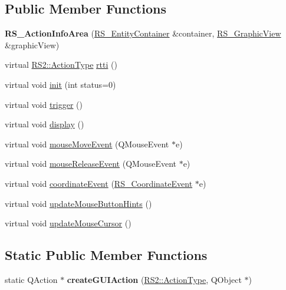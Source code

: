 \subsection*{Public Member Functions}
\begin{DoxyCompactItemize}
\item 
\hypertarget{classRS__ActionInfoArea_aeaefc6938d72919ed31129059a7d3b2c}{{\bfseries R\-S\-\_\-\-Action\-Info\-Area} (\hyperlink{classRS__EntityContainer}{R\-S\-\_\-\-Entity\-Container} \&container, \hyperlink{classRS__GraphicView}{R\-S\-\_\-\-Graphic\-View} \&graphic\-View)}\label{classRS__ActionInfoArea_aeaefc6938d72919ed31129059a7d3b2c}

\item 
virtual \hyperlink{classRS2_afe3523e0bc41fd637b892321cfc4b9d7}{R\-S2\-::\-Action\-Type} \hyperlink{classRS__ActionInfoArea_a74c3f74c070e1ca046324e88b93ea7b8}{rtti} ()
\item 
virtual void \hyperlink{classRS__ActionInfoArea_a4ad8dbce488f70efe38e14b924256168}{init} (int status=0)
\item 
virtual void \hyperlink{classRS__ActionInfoArea_aa4a77a0063610c4a69c99e517e89c92a}{trigger} ()
\item 
virtual void \hyperlink{classRS__ActionInfoArea_a412ba2be3917ab973e9a945afd234772}{display} ()
\item 
virtual void \hyperlink{classRS__ActionInfoArea_a1d9520f7011635bfa38f499212f42f84}{mouse\-Move\-Event} (Q\-Mouse\-Event $\ast$e)
\item 
virtual void \hyperlink{classRS__ActionInfoArea_a917b2bc96d7884fda3d06d3d33a9d952}{mouse\-Release\-Event} (Q\-Mouse\-Event $\ast$e)
\item 
virtual void \hyperlink{classRS__ActionInfoArea_a468c8b3ce206199044c9d7972b58b189}{coordinate\-Event} (\hyperlink{classRS__CoordinateEvent}{R\-S\-\_\-\-Coordinate\-Event} $\ast$e)
\item 
virtual void \hyperlink{classRS__ActionInfoArea_ac62fa1390216e3ddd0d5b14a18db330a}{update\-Mouse\-Button\-Hints} ()
\item 
virtual void \hyperlink{classRS__ActionInfoArea_a9bdefcdacce86d8a0488781e4689a46c}{update\-Mouse\-Cursor} ()
\end{DoxyCompactItemize}
\subsection*{Static Public Member Functions}
\begin{DoxyCompactItemize}
\item 
\hypertarget{classRS__ActionInfoArea_af8b98a31628880a4f8b3a90ee28a0d99}{static Q\-Action $\ast$ {\bfseries create\-G\-U\-I\-Action} (\hyperlink{classRS2_afe3523e0bc41fd637b892321cfc4b9d7}{R\-S2\-::\-Action\-Type}, Q\-Object $\ast$)}\label{classRS__ActionInfoArea_af8b98a31628880a4f8b3a90ee28a0d99}

\end{DoxyCompactItemize}

